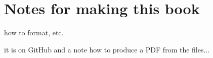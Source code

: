 \chapter{Notes for making this book}

how to format, etc.

it is on GitHub and a note how to produce a PDF from the files...


